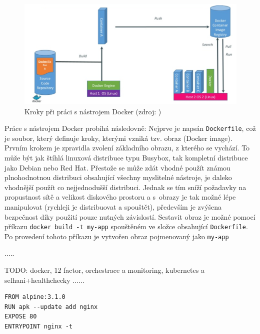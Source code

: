 \documentclass[FM,DP]{tulthesis}
\newenvironment{code}
    {\filbreak\captionsetup{type=listing}}{\filbreak}
\begin{document}
\begin{figure}[h]
\center
\includegraphics[width=\textwidth]{docker-flow.png}
\caption{Kroky při práci s nástrojem Docker (zdroj: \cite{docker-flow})}
\label{docker-flow}
\end{figure}

Práce s nástrojem Docker probíhá následovně: Nejprve je napsán \verb|Dockerfile|, což je soubor, který
definuje kroky, kterými vzniká tzv. obraz (Docker image). Prvním krokem je zpravidla zvolení základního obrazu, 
z kterého se vychází. To může být jak štíhlá linuxová distribuce typu Busybox, tak kompletní distribuce jako
Debian nebo Red Hat. Přestože se může zdát vhodné použít známou plnohodnotnou distribuci obsahující všechny
myslitelné nástroje, je daleko vhodnější použít co nejjednodušší distribuci. Jednak se tím sníží požadavky na
propustnost sítě a velikost diskového prostoru a s~obrazy je tak možné lépe manipulovat (rychleji je distribuovat
a spouštět), především je zvýšena bezpečnost díky použití pouze nutných závislostí. Sestavit obraz je možné
pomocí příkazu \verb|docker build -t my-app| spouštěném ve složce obsahující \verb|Dockerfile|. Po provedení 
tohoto příkazu je vytvořen obraz pojmenovaný jako \verb|my-app|

.....

TODO: docker, 12 factor, orchestrace a monitoring, kubernetes a selhani+healthchecky ......

\begin{code}
\captionsetup{singlelinecheck=false,justification=raggedright}
\label{code:dockerfile}
\begin{verbatim}
FROM alpine:3.1.0
RUN apk --update add nginx
EXPOSE 80
ENTRYPOINT nginx -t
\end{verbatim}
\end{code}


\end{document}
